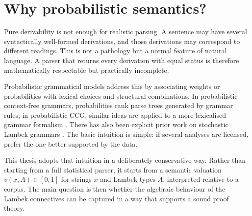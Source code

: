 \section{Why probabilistic semantics?}
Pure derivability is not enough for realistic parsing. A sentence may have several syntactically
well-formed derivations, and those derivations may correspond to different readings. This is not a
pathology but a normal feature of natural language. A parser that returns every derivation with
equal status is therefore mathematically respectable but practically incomplete.

Probabilistic grammatical models address this by associating weights or probabilities with lexical
choices and structural combinations. In probabilistic context-free grammars, probabilities rank
parse trees generated by grammar rules; in probabilistic CCG, similar ideas are applied to a more
lexicalised grammar formalism \citep{ManningSchutze1999,ClarkCurran2007}. There has also been
explicit prior work on stochastic Lambek grammars \citep{BonfanteDeGroote2004}. The basic
intuition is simple: if several analyses are licensed, prefer the one better supported by the data.

This thesis adopts that intuition in a deliberately conservative way. Rather than starting from a
full statistical parser, it starts from a semantic valuation $v(x,A) \in [0,1]$ for strings $x$ and
Lambek types $A$, interpreted relative to a corpus. The main question is then whether the
algebraic behaviour of the Lambek connectives can be captured in a way that supports a
sound proof theory.

